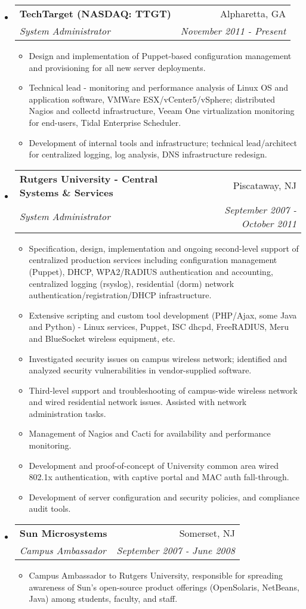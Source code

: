 \documentclass[letterpaper,11pt]{article}
\makeatletter
\newcommand{\resitem}[1]{\item #1 \vspace{-2pt}}
\newcommand{\ressubheading}[4]{
\begin{tabular*}{7.0in}{l@{\extracolsep{\fill}}r}
		\textbf{#1} & #2 \\
		\textit{#3} & \textit{#4} \\
\end{tabular*}\vspace{-6pt}}
\makeatother
\begin{document}
\begin{itemize}
\item
	\ressubheading{TechTarget  (NASDAQ: TTGT)}{Alpharetta, GA}{System Administrator}{November 2011 - Present}
	\begin{itemize}
		\resitem{Design and implementation of Puppet-based configuration management and provisioning for all new server deployments.}
                \resitem{Technical lead - monitoring and performance analysis of Linux OS and application software, VMWare ESX/vCenter5/vSphere; distributed Nagios and collectd infrastructure, Veeam One virtualization monitoring for end-users, Tidal Enterprise Scheduler.}
                \resitem{Development of internal tools and infrastructure; technical lead/architect for centralized logging, log analysis, DNS infrastructure redesign.}
	\end{itemize}

\item
	\ressubheading{Rutgers University - Central Systems \&
          Services}{Piscataway, NJ}{System Administrator}{September 2007 - October 2011}
	\begin{itemize}
                \resitem{Specification, design, implementation and ongoing second-level support of centralized production services including configuration management (Puppet), DHCP, WPA2/RADIUS authentication and accounting, centralized logging (rsyslog), residential (dorm) network authentication/registration/DHCP infrastructure.}
                \resitem{Extensive scripting and custom tool development
                  (PHP/Ajax, some Java and Python)
                  - Linux services, Puppet, ISC dhcpd, FreeRADIUS, Meru and BlueSocket wireless equipment, etc.}
                \resitem{Investigated security issues on campus wireless network; identified and analyzed security vulnerabilities in vendor-supplied software.}
                \resitem{Third-level support and troubleshooting of campus-wide wireless network and wired residential network issues. Assisted with network administration tasks.}
                \resitem{Management of Nagios and Cacti for availability and performance monitoring.}
		\resitem{Development and proof-of-concept of University common area wired 802.1x authentication, with captive portal and MAC auth fall-through.}
		\resitem{Development of server configuration and security
                  policies, and compliance audit tools.}
	\end{itemize}

\item
        \ressubheading{Sun Microsystems}{Somerset, NJ}{Campus Ambassador}{September 2007 - June 2008}
        \begin{itemize}
                \resitem{Campus Ambassador to Rutgers University, responsible for spreading awareness of Sun's open-source product offerings (OpenSolaris, NetBeans, Java) among students, faculty, and staff.}
        \end{itemize}


\end{itemize}
\end{document}
